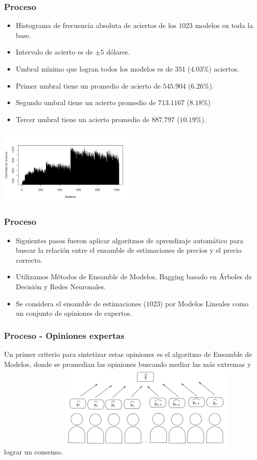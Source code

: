 \documentclass{beamer}
\begin{document}
\begin{frame}[t]
\frametitle{Proceso}
\vfill
\begin{itemize}
\item
Histograma de frecuencia absoluta de aciertos de los $1023$ modelos en toda la base.
\item
Intervalo de acierto es de $\pm 5$ dólares.
\item
Umbral mínimo que logran todos los modelos es de $351$ ($4.03\%$) aciertos. 
\item
Primer umbral tiene un promedio de acierto de $545.904$ ($6.26\%$).
\item
Segundo umbral tiene un acierto promedio de $713.1167$ ($8.18\%$) 
\item
Tercer umbral tiene un acierto promedio de $887.797$ ($10.19\%$). 
\end{itemize}

\centering
\includegraphics[width=0.5\textwidth]{histograma}

\vfill
\end{frame}

\begin{frame}[t]
\frametitle{Proceso}
\vfill
\begin{itemize}
\item
Siguientes pasos fueron aplicar algoritmos de aprendizaje automático para buscar la relación entre el ensamble de estimaciones de precios y el precio correcto. 
\item
Utilizamos Métodos de Ensamble de Modelos, Bagging basado en Árboles de Decisión y Redes Neuronales.
\item
Se considera el ensamble de estimaciones ($1023$) por Modelos Lineales como un conjunto de opiniones de expertos.
\end{itemize}
\vfill
\end{frame}

\begin{frame}[t]
\frametitle{Proceso - Opiniones expertas}
\vfill
Un primer criterio para sintetizar estas opiniones es el algoritmo de Ensamble de Modelos, donde se promedian las opiniones buscando mediar las  más extremas y lograr un consenso. 
\vfill
\centering
\includegraphics[width=0.65\textwidth]{diagramMeanExpertOpinion}


\end{frame}
\end{document}
